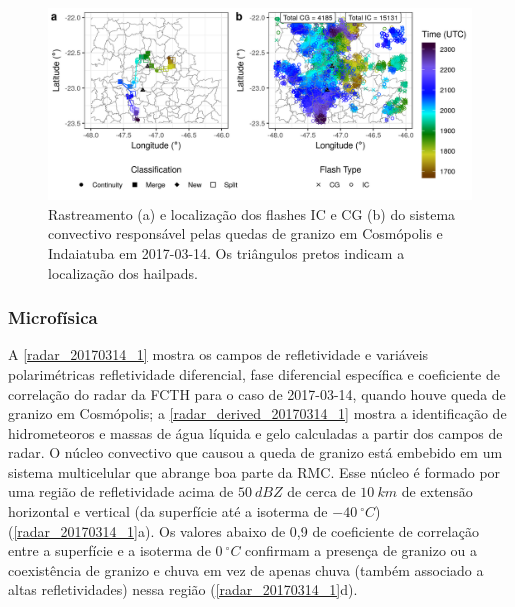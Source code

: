 \begin{figure}[htb]
	\begin{center}
		\caption{Rastreamento (a) e localização dos flashes IC e CG (b) do sistema convectivo responsável pelas quedas de granizo em Cosmópolis e Indaiatuba em 2017-03-14. Os triângulos pretos indicam a localização dos hailpads.} 
		\label{track_flashes_20170314}
		\includegraphics[width=\columnwidth]{../General_Processing/figures/track_flashes_20170314.png}
	\end{center}
\end{figure}

\subsubsection{Microfísica}\label{micro_201703014}

A \autoref{radar_20170314_1} mostra os campos de refletividade e variáveis polarimétricas refletividade diferencial, fase diferencial específica e coeficiente de correlação do radar da FCTH para o caso de 2017-03-14, quando houve queda de granizo em Cosmópolis; a \autoref{radar_derived_20170314_1} mostra a identificação de hidrometeoros e massas de água líquida e gelo calculadas a partir dos campos de radar. O núcleo convectivo que causou a queda de granizo está embebido em um sistema multicelular que abrange boa parte da RMC. Esse núcleo é formado por uma região de refletividade acima de $50\:dBZ$ de cerca de $10\:km$ de extensão horizontal e vertical (da superfície até a isoterma de $-40\:^{\circ}C$) (\autoref{radar_20170314_1}a). Os valores abaixo de 0,9 de coeficiente de correlação entre a superfície e a isoterma de $0\:^{\circ}C$ confirmam a presença de granizo ou a coexistência de granizo e chuva em vez de apenas chuva (também associado a altas refletividades) nessa região (\autoref{radar_20170314_1}d).

